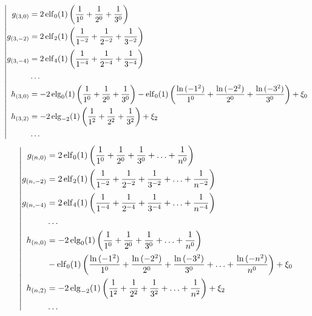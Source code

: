 \begin{equation*} \left| \begin{aligned}
g_{(3,0)} &=
  2 \elf_0(1) \left(
  \frac{1}{1^0}
+ \frac{1}{2^0}
+ \frac{1}{3^0} \right) \\
%
g_{(3,-2)} &=
  2 \elf_2(1) \left(
  \frac{1}{1^{-2}}
+ \frac{1}{2^{-2}}
+ \frac{1}{3^{-2}} \right) \\
%
g_{(3,-4)} &=
  2 \elf_4(1) \left(
  \frac{1}{1^{-4}}
+ \frac{1}{2^{-4}}
+ \frac{1}{3^{-4}} \right) \\
%
&\ldots \\
%
h_{(3,0)} &=
- 2 \elg_0(1) \left(
  \frac{1}{1^0}
+ \frac{1}{2^0}
+ \frac{1}{3^0} \right)
- \elf_0(1) \left(
  \frac{\ln{(-1^2)}}{1^0}
+ \frac{\ln{(-2^2)}}{2^0}
+ \frac{\ln{(-3^2)}}{3^0} \right)
+ \xi_0 \\
%
h_{(3,2)} &=
- 2 \elg_{-2}(1) \left(
  \frac{1}{1^2}
+ \frac{1}{2^2}
+ \frac{1}{3^2} \right)
+ \xi_2 \\
%
&\ldots \\
\end{aligned} \right. \end{equation*}
%
\begin{equation*} \left| \begin{aligned}
g_{(n,0)} &=
  2 \elf_0(1) \left(
  \frac{1}{1^0}
+ \frac{1}{2^0}
+ \frac{1}{3^0}
+ \ldots
+ \frac{1}{n^0} \right) \\
%
g_{(n,-2)} &=
  2 \elf_2(1) \left(
  \frac{1}{1^{-2}}
+ \frac{1}{2^{-2}}
+ \frac{1}{3^{-2}}
+ \ldots
+ \frac{1}{n^{-2}} \right) \\
%
g_{(n,-4)} &=
  2 \elf_4(1) \left(
  \frac{1}{1^{-4}}
+ \frac{1}{2^{-4}}
+ \frac{1}{3^{-4}}
+ \ldots
+ \frac{1}{n^{-4}} \right) \\
%
&\ldots \\
%
h_{(n,0)} &=
- 2 \elg_0(1) \left(
  \frac{1}{1^0}
+ \frac{1}{2^0}
+ \frac{1}{3^0}
+ \ldots
+ \frac{1}{n^0} \right) \\ &
- \elf_0(1) \left(
  \frac{\ln{(-1^2)}}{1^0}
+ \frac{\ln{(-2^2)}}{2^0}
+ \frac{\ln{(-3^2)}}{3^0}
+ \ldots
+ \frac{\ln{(-n^2)}}{n^0} \right)
+ \xi_0 \\
%
h_{(n,2)} &=
- 2 \elg_{-2}(1) \left(
  \frac{1}{1^2}
+ \frac{1}{2^2}
+ \frac{1}{3^2}
+ \ldots
+ \frac{1}{n^2} \right)
+ \xi_2 \\
%
&\ldots \\
\end{aligned} \right. \end{equation*}
